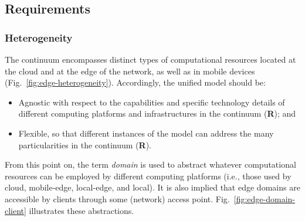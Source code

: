 
\subsection{Requirements}


\subsubsection*{Heterogeneity}

The continuum encompasses distinct types of computational resources located at the cloud and at the edge of the network, as well as in mobile devices (Fig.~\ref{fig:edge-heterogeneity}). Accordingly, the unified model should be:

\begin{itemize}


\item  Agnostic with respect to the capabilities and specific technology details of different computing platforms and infrastructures in the continuum (\textbf{R}); and

\item Flexible, so that different instances of the model can address the many particularities in the continuum (\textbf{R}).

\end{itemize}

From this point on, the term \textit{domain} is used to abstract whatever computational resources can be employed by different computing platforms (i.e., those used by cloud, mobile-edge, local-edge, and local). It is also implied that edge domains are accessible by clients through some (network) access point. Fig.~\ref{fig:edge-domain-client} illustrates these abstractions. 

